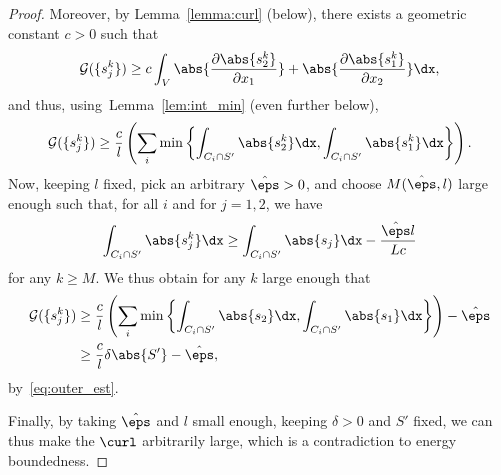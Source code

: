 \documentclass[11pt,reqno]{amsart}
\theoremstyle{plain}
\theoremstyle{definition}
\theoremstyle{remark}
\begin{document}
\begin{proof}
Moreover, by Lemma~\ref{lemma:curl} (below), there exists a geometric constant $c>0$ such that 
$$
\mathcal{G}(\{s_j^k\})\ge  c\int_V \abs{\frac{\partial \abs{s_2^k}}{\partial x_1}}  +  \abs{\frac{\partial \abs{s_1^k}}{\partial x_2}}\dx, 
$$
and thus, using~Lemma~\ref{lem:int_min} (even further below), 
$$
\mathcal{G}(\{s_j^k\}) \ge \frac{c}{l}\left(\sum_i \min \left\{\int_{C_i\cap S'}\abs{s_2^k}\dx, \int_{C_i\cap S'}\abs{s_1^k}\dx\right\}\right).
$$
Now, keeping $l$ fixed, pick an arbitrary $\hat{\eps}>0$, and choose $M(\hat{\eps},l)$ large enough such that, for all $i$ and for $j=1,2$, we have
$$
\int_{C_i\cap S'} \abs{s_j^k}\dx\ge \int_{C_i\cap S'} \abs{s_j}\dx - \frac{\hat{\eps}l}{Lc}
$$
for any $k\ge M$. We thus obtain for any $k$ large enough that
\begin{align*}
\mathcal{G}(\{s_j^k\}) &\ge \frac{c}{l}\left(\sum_i \min \left\{\int_{C_i\cap S'}\abs{s_2}\dx, \int_{C_i\cap S'}\abs{s_1}\dx\right\}\right) - \hat{\eps} \\
&\ge \frac{c}{l}\delta\abs{S'} - \hat{\eps},
\end{align*}
by~\eqref{eq:outer_est}.

Finally, by taking $\hat{\eps}$ and $l$ small enough, keeping $\delta>0$ and $S'$ fixed, we can thus make the $\curl$ arbitrarily large, which is a contradiction to energy boundedness.
\end{proof}
\end{document}
